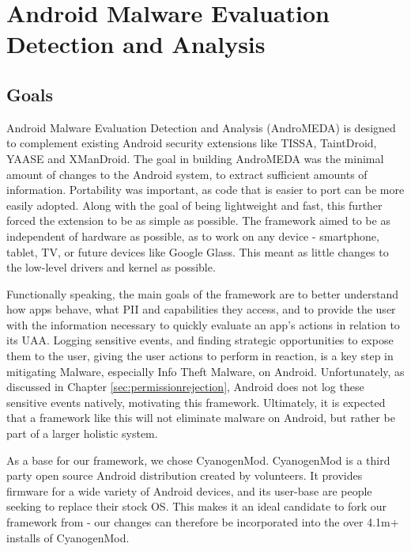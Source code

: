 \chapter{Android Malware Evaluation Detection and Analysis}
\label{sec:architecture}

\section{Goals}
Android Malware Evaluation Detection and Analysis (AndroMEDA) is designed to complement existing Android security extensions like TISSA\citep{zhou2011taming}, TaintDroid\citep{enck2010taintdroid}, YAASE\citep{russello2011yaase} and XManDroid\citep{bugiel2011xmandroid}. The goal in building AndroMEDA was the minimal amount of changes to the Android system, to extract sufficient amounts of information. Portability was important, as code that is easier to port can be more easily adopted. Along with the goal of being lightweight and fast, this further forced the extension to be as simple as possible. The framework aimed to be as independent of hardware as possible, as to work on any device - smartphone, tablet, TV, or future devices like Google Glass. This meant as little changes to the low-level drivers and kernel as possible.

Functionally speaking, the main goals of the framework are to better understand how apps behave, what PII and capabilities they access, and to provide the user with the information necessary to quickly evaluate an app's actions in relation to its UAA. Logging sensitive events, and finding strategic opportunities to expose them to the user, giving the user actions to perform in reaction, is a key step in mitigating Malware, especially Info Theft Malware, on Android. Unfortunately, as discussed in Chapter \ref{sec:permissionrejection}, Android does not log these sensitive events natively, motivating this framework. Ultimately, it is expected that a framework like this will not eliminate malware on Android, but rather be part of a larger holistic system.

As a base for our framework, we chose CyanogenMod\citep{cyanogenmod}. CyanogenMod is a third party open source Android distribution created by volunteers. It provides firmware for a wide variety of Android devices, and its user-base are people seeking to replace their stock OS. This makes it an ideal candidate to fork our framework from - our changes can therefore be incorporated into the over 4.1m+ installs of CyanogenMod\citep{cyanogenmodstats}.

